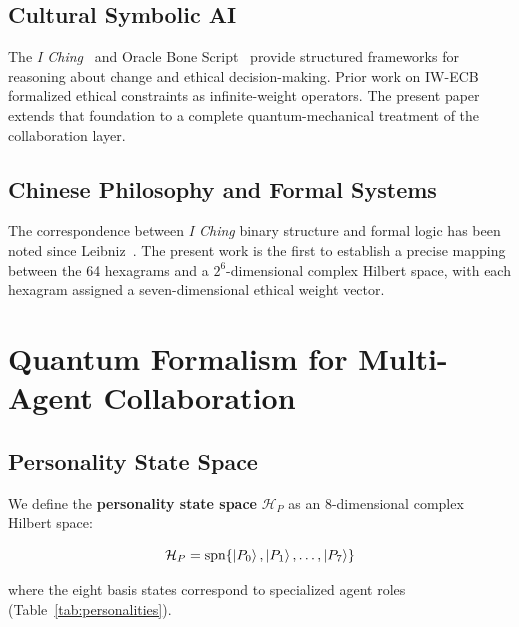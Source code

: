 \documentclass[conference]{IEEEtran}
\begin{document}
\subsection{Cultural Symbolic AI}

The \textit{I Ching}~\cite{wilhelm1994iching} and Oracle
Bone Script~\cite{keightley1978shang} provide structured
frameworks for reasoning about change and ethical
decision-making. Prior work on IW-ECB~\cite{iwecb2026}
formalized ethical constraints as infinite-weight operators.
The present paper extends that foundation to a complete
quantum-mechanical treatment of the collaboration layer.

\subsection{Chinese Philosophy and Formal Systems}

The correspondence between \textit{I Ching} binary
structure and formal logic has been noted since
Leibniz~\cite{shaughnessy1997unearthed}. The present
work is the first to establish a precise mapping between
the 64 hexagrams and a $2^6$-dimensional complex Hilbert
space, with each hexagram assigned a seven-dimensional
ethical weight vector.

\section{Quantum Formalism for Multi-Agent Collaboration}

\subsection{Personality State Space}

We define the \textbf{personality state space}
$\mathcal{H}_P$ as an 8-dimensional complex Hilbert space:

\begin{equation}
  \mathcal{H}_P = \text{spn}\{
    \ket{P_0}, \ket{P_1}, \ldots, \ket{P_7}
  \}
  \label{eq:hilbert}
\end{equation}

where the eight basis states correspond to specialized
agent roles (Table~\ref{tab:personalities}).
\end{document}
